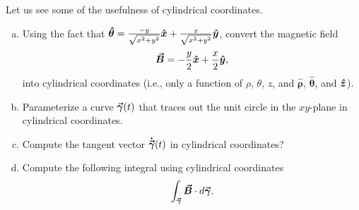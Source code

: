 \documentclass[12pt]{article} %
\newcommand{\vecfieldB}{\boldsymbol{\vec{B}}}
\newcommand{\thetahat}{\boldsymbol{\hat{\theta}}}
\newcommand{\rhohat}{\boldsymbol{\hat{\rho}}}
\begin{document}
\newpage
\begin{problem}
Let us see some of the usefulness of cylindrical coordinates.
\begin{enumerate}[(a)]
    \item Using the fact that $\thetahat = \frac{-y}{\sqrt{x^2+y^2}}\xhat + \frac{x}{\sqrt{x^2+y^2}}\yhat$, convert the magnetic field 
    \[
    \vecfieldB = -\frac{y}{2}\xhat + \frac{x}{2}\yhat,
    \]
    into cylindrical coordinates (i.e., only a function of $\rho$, $\theta$, $z$, and $\rhohat$, $\thetahat$, and $\boldsymbol{\hat{z}}$).  
        \item Parameterize a curve $\boldsymbol{\vec{\gamma}}(t)$ that traces out the unit circle in the $xy$-plane in cylindrical coordinates.
        \item Compute the tangent vector $\boldsymbol{\dot{\vec{\gamma}}}(t)$ in cylindrical coordinates?
        \item Compute the following integral using cylindrical coordinates
        \[
        \int_{\curvegamma} \vecfieldB \cdot d\curvegamma.
        \]
\end{enumerate}
\end{problem}
\end{document}
